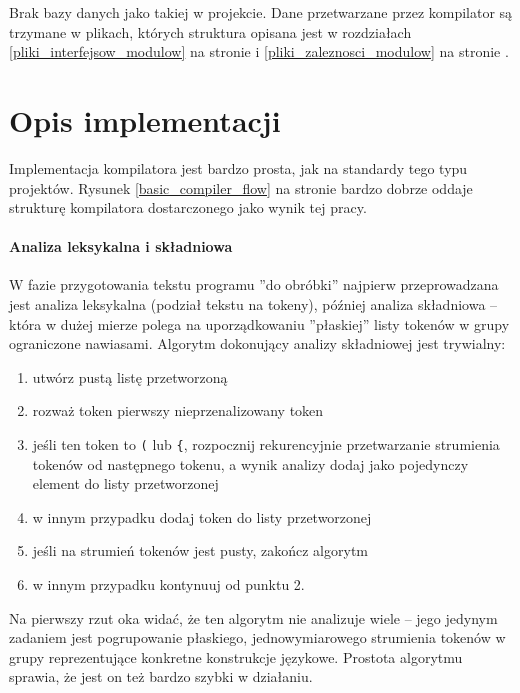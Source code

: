 Brak bazy danych jako takiej w projekcie.
Dane przetwarzane przez kompilator są trzymane w plikach, których struktura opisana jest w rozdziałach
\ref{pliki_interfejsow_modulow} na stronie \pageref{pliki_interfejsow_modulow} i
\ref{pliki_zaleznosci_modulow} na stronie \pageref{pliki_zaleznosci_modulow}.

\section{Opis implementacji}

Implementacja kompilatora jest bardzo prosta, jak na standardy tego typu projektów.
Rysunek \ref{basic_compiler_flow} na stronie \pageref{basic_compiler_flow} bardzo dobrze oddaje strukturę
kompilatora dostarczonego jako wynik tej pracy.

\paragraph*{Analiza leksykalna i składniowa}
W fazie przygotowania tekstu programu ''do obróbki'' najpierw przeprowadzana jest analiza leksykalna (podział
tekstu na tokeny), później analiza składniowa -- która w dużej mierze polega na uporządkowaniu ''płaskiej''
listy tokenów w grupy ograniczone nawiasami. Algorytm dokonujący analizy składniowej jest trywialny:

\begin{enumerate}
    \item utwórz pustą listę przetworzoną
    \item rozważ token pierwszy nieprzenalizowany token
    \item jeśli ten token to \texttt{(} lub \texttt{\{}, rozpocznij rekurencyjnie przetwarzanie strumienia
        tokenów od następnego tokenu, a wynik analizy dodaj jako pojedynczy element do listy przetworzonej
    \item w innym przypadku dodaj token do listy przetworzonej
    \item jeśli na strumień tokenów jest pusty, zakończ algorytm
    \item w innym przypadku kontynuuj od punktu 2.
\end{enumerate}

Na pierwszy rzut oka widać, że ten algorytm nie analizuje wiele -- jego jedynym zadaniem jest pogrupowanie
płaskiego, jednowymiarowego strumienia tokenów w grupy reprezentujące konkretne konstrukcje językowe. Prostota
algorytmu sprawia, że jest on też bardzo szybki w działaniu.

